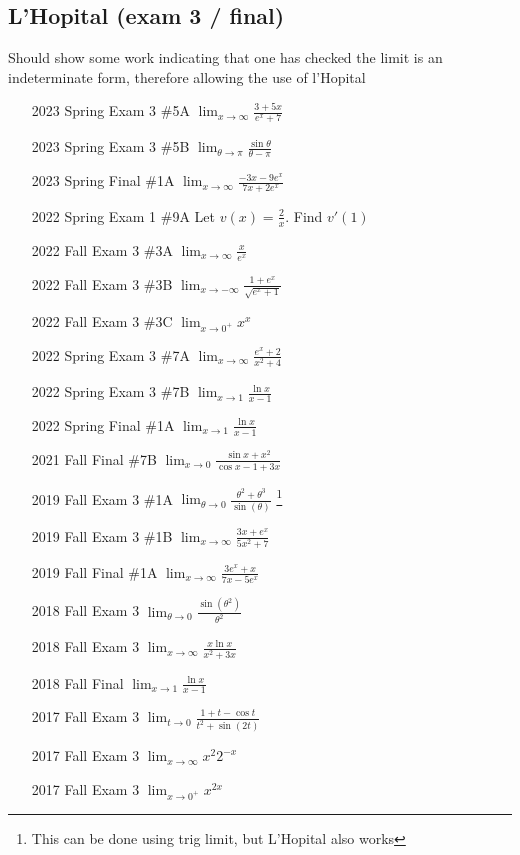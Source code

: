 \documentclass[10pt]{scrartcl}
\theoremstyle{definition}
\begin{document}
\subsection{L'Hopital (exam 3 / final)}
Should show some work indicating that one has checked the limit is an indeterminate form, therefore allowing the use of l'Hopital
\begin{enumerate}
\item[2023 Spring Exam 3 \#5A] $\lim_{x\to\infty} \frac{3+5x}{e^x+7}$
\item[2023 Spring Exam 3 \#5B] $\lim_{\theta\to\pi} \frac{\sin\theta}{\theta-\pi}$
\item[2023 Spring Final \#1A] $\lim_{x\to\infty} \frac{-3x-9e^x}{7x+2e^x}$
\item [2022 Spring Exam 1 \#9A] Let $v(x) = \frac{2}{x}$. Find $v'(1)$
\item [2022 Fall Exam 3 \#3A] $\lim_{x\to\infty} \frac{x}{e^x}$
\item [2022 Fall Exam 3 \#3B] $\lim_{x\to-\infty} \frac{1+e^x}{\sqrt{e^x+1}}$
\item [2022 Fall Exam 3 \#3C] $\lim_{x\to0^{+}} x^x$
\item[2022 Spring Exam 3 \#7A] $\lim_{x\to\infty} \frac{e^x+2}{x^2+4}$
\item[2022 Spring Exam 3 \#7B] $\lim_{x\to1} \frac{\ln x}{x-1}$
\item[2022 Spring Final \#1A] $\lim_{x\to1} \frac{\ln x}{x-1}$
\item[2021 Fall Final \#7B] $\lim_{x\to0} \frac{\sin x+x^2}{\cos x-1+3x}$
\item [2019 Fall Exam 3 \#1A] $\lim_{\theta\to0} \frac{\theta^2+\theta^3}{\sin(\theta)}$ \footnote{This can be done using trig limit, but L'Hopital also works}
\item [2019 Fall Exam 3 \#1B] $\lim_{x\to\infty} \frac{3x+e^x}{5x^2+7}$
\item [2019 Fall Final \#1A] $\lim_{x\to\infty} \frac{3e^x + x}{7x-5e^x}$
\item [2018 Fall Exam 3] $\lim_{\theta \to 0} \frac{\sin(\theta^2)}{\theta^2}$
\item [2018 Fall Exam 3] $\lim_{x\to\infty} \frac{x \ln x}{x^2 + 3x}$
\item [2018 Fall Final] $\lim_{x\to1} \frac{\ln x}{x-1}$
\item [2017 Fall Exam 3] $\lim_{t\to0} \frac{1+t-\cos t}{t^2 + \sin(2t)}$
\item [2017 Fall Exam 3] $\lim_{x\to\infty} x^2 2^{-x}$
\item [2017 Fall Exam 3] $\lim_{x\to0^+} x^{2x}$

\end{enumerate}
\end{document}
